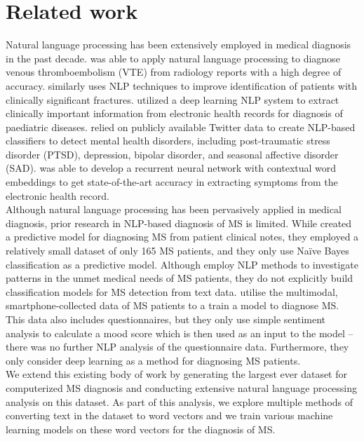 \documentclass[11pt,a4paper]{article}
\begin{document}
\section{Related work}
Natural language processing has been extensively employed in medical diagnosis in the past decade. \citet{Swartz:17} was able to apply natural language processing to diagnose venous thromboembolism (VTE) from radiology reports with a high degree of accuracy.
\citet{Kolanu:20} similarly uses NLP techniques to improve identification of patients with clinically significant fractures. \citet{Liang:19} utilized a deep learning NLP system to extract clinically important information from electronic health records for diagnosis of paediatric diseases. \citet{Coppersmith:14} relied on publicly available Twitter data to create NLP-based classifiers to detect mental health disorders, including post-traumatic stress disorder (PTSD), depression, bipolar disorder, and seasonal affective disorder (SAD). \citet{Yang:19} was able to develop a recurrent neural network with contextual word embeddings to get state-of-the-art accuracy in extracting symptoms from the electronic health record. \\
\indent Although natural language processing has been pervasively applied in medical diagnosis, prior research in NLP-based diagnosis of MS is limited. While \citet{Chase:17} created a predictive model for diagnosing MS from patient clinical notes, they employed a relatively small dataset of only 165 MS patients, and they only use Naïve Bayes classification as a predictive model. Although \citet{Koss;Joschko:22} employ NLP methods to investigate patterns in the unmet medical needs of MS patients, they do not explicitly build classification models for MS detection from text data. \citet{Schwab;Karlen:21} utilise the multimodal, smartphone-collected data of MS patients to a train a model to diagnose MS. This data also includes questionnaires, but they only use simple sentiment analysis to calculate a mood score which is then used as an input to the model – there was no further NLP analysis of the questionnaire data. Furthermore, they only consider deep learning as a method for diagnosing MS patients. \\
\indent We extend this existing body of work by generating the largest ever dataset for computerized MS diagnosis and conducting extensive natural language processing analysis on this dataset. As part of this analysis, we explore multiple methods of converting text in the dataset to word vectors and we train various machine learning models on these word vectors for the diagnosis of MS. 
\end{document}
